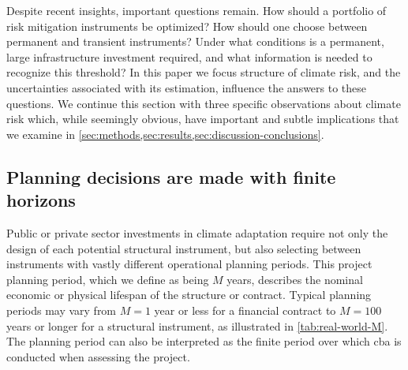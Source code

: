 \documentclass[
  draft,
  linenumbers
]{agujournal2019}
\begin{document}
Despite recent insights, important questions remain.
How should a portfolio of risk mitigation instruments be optimized?
How should one choose between permanent and transient instruments?
Under what conditions is a permanent, large infrastructure investment required, and what information is needed to recognize this threshold?
In this paper we focus  structure of climate risk, and the uncertainties associated with its estimation, influence the answers to these questions.
We continue this section with three specific observations about climate risk which, while seemingly obvious, have important and subtle implications that we examine in \cref{sec:methods,sec:results,sec:discussion-conclusions}.

\subsection{Planning decisions are made with finite horizons}\label{sec:intro-finite}

Public or private sector investments in climate adaptation require not only the design of each potential structural instrument, but also selecting between instruments with vastly different operational planning periods.
This project planning period, which we define as being $M$ years, describes the nominal economic or physical lifespan of the structure or contract.
Typical planning periods may vary from $M=1$ year or less for a financial contract to $M=100$ years or longer for a structural instrument, as illustrated in \cref{tab:real-world-M}.
The planning period can also be interpreted as the finite period over which \gls{cba} is conducted when assessing the project.
\end{document}

